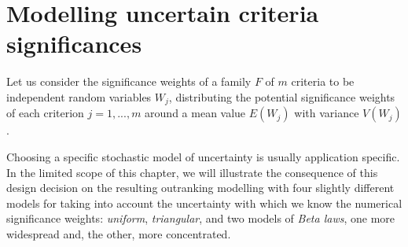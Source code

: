 \section{Modelling uncertain criteria significances}
\label{sec:18.1}

Let us consider the significance weights of a family $F$ of $m$ criteria to be independent random variables $W_j$, distributing the potential significance weights of each criterion $j = 1, ..., m$ around a mean value $E(W_j)$ with variance $V(W_j)$.

Choosing a specific stochastic model of uncertainty is usually application specific. In the limited scope of this chapter, we will illustrate the consequence of this design decision on the resulting outranking modelling with four slightly different models for taking into account the uncertainty with which we know the numerical significance weights: \emph{uniform}, \emph{triangular}, and two models of \emph{Beta laws}, one more widespread and, the other, more concentrated.

